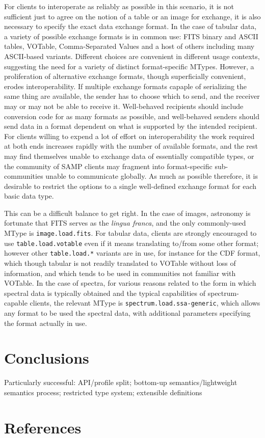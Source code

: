 \documentclass[5p]{elsarticle}
\begin{document}
For clients to interoperate as reliably as possible in this scenario,
it is not sufficient just to agree on the notion of a table or an image
for exchange, it is also necessary to specify the exact data exchange
format.
In the case of tabular data, a variety of possible exchange formats
is in common use: FITS binary and ASCII tables, VOTable,
Comma-Separated Values and a host of others including 
many ASCII-based variants.  Different choices are convenient in
different usage contexts, suggesting the need for a variety of
distinct format-specific MTypes.
However, a proliferation of alternative exchange formats,
though superficially convenient, erodes interoperability.
If multiple exchange formats capaple of serializing the same thing
are available,
the sender has to choose which to send, and the receiver may or
may not be able to receive it.
Well-behaved recipients should include conversion code for as many
formats as possible, and well-behaved senders should send data
in a format dependent on what is supported by the intended recipient.
For clients willing to expend a lot of effort on interoperability 
the work required at both ends increases rapidly with the number of
available formats, and the rest may find themselves unable to
exchange data of essentially compatible types,
or the community of SAMP clients may fragment into format-specific
sub-communities unable to communicate globally.
As much as possible therefore, it is desirable to restrict the options
to a single well-defined exchange format for each basic data type.

This can be a difficult balance to get right.
In the case of images, astronomy is fortunate that FITS serves as
the {\em lingua franca\/}, and the only commonly-used MType is
{\tt image.load.fits}.
For tabular data, clients are strongly encouraged to use
{\tt table.load.votable} even if it means translating to/from
some other format; however other {\tt table.load.*} variants are
in use, for instance for the CDF format, which though tabular is
not readily translated to VOTable without loss of information,
and which tends to be used in communities not familiar with VOTable.
In the case of spectra, for various reasons related to the
form in which spectral data is typically obtained and
the typical capabilities of spectrum-capable clients,
the relevant MType is {\tt spectrum.load.ssa-generic},
which allows any format to be used the spectral data,
with additional parameters specifying
the format actually in use.


\section{Conclusions} \label{sec:conclusion}

Particularly successful: API/profile split;
bottom-up semantics/lightweight semantics process;
restricted type system; extensible definitions
  

\section*{References}


\end{document}

